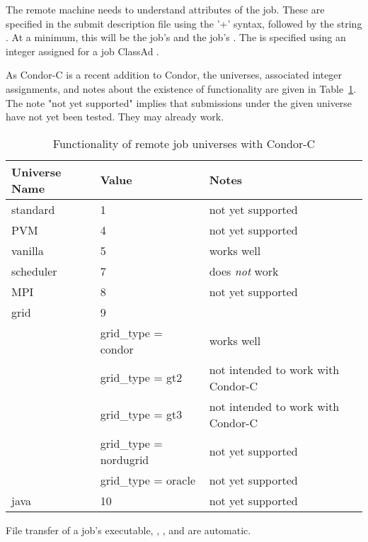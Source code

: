 The remote machine needs to understand attributes of the job.
These are specified in the submit description file using the '+'
syntax, followed by the string .
At a minimum, this will be the job's  and the job's
.
The  is specified using an integer assigned for
a job ClassAd . 

As Condor-C is a recent addition to Condor,
the universes, associated integer assignments,
and notes about the existence of functionality are given in 
Table~\ref{working-remote-universes}.
The note "not yet supported" implies that
submissions under the given universe have not yet
been tested.
They may already work.

\begin{center}
\begin{table}[hbt]
\begin{tabular}{|l|l|l}
\textbf{Universe Name} & \textbf{Value} & \textbf{Notes}\\ \hline \hline
standard  & 1 & not yet supported \\ \hline
PVM       & 4 & not yet supported \\ \hline
vanilla   & 5 & works well \\ \hline
scheduler & 7 & does \emph{not} work \\ \hline
MPI       & 8 & not yet supported \\ \hline
grid      & 9 & \\
 & grid\_type = condor & works well \\
 & grid\_type = gt2  & not intended to work with Condor-C \\
 & grid\_type = gt3 & not intended to work with Condor-C \\
 & grid\_type = nordugrid & not yet supported \\
 & grid\_type = oracle & not yet supported \\ \hline
java & 10 & not yet supported \\ \hline
\end{tabular}
\caption{\label{working-remote-universes}Functionality of remote job universes with Condor-C}
\end{table}
\end{center}

File transfer of a job's executable, , , and
 are automatic.

